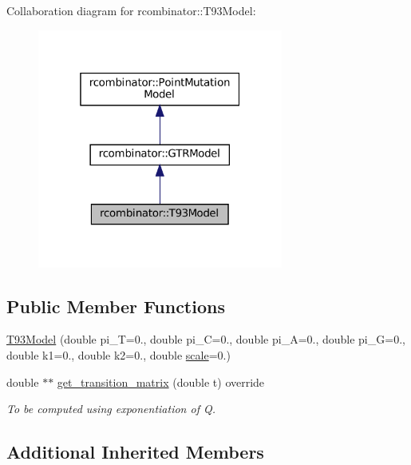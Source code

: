 Collaboration diagram for rcombinator\+:\+:T93\+Model\+:\nopagebreak
\begin{figure}[H]
\begin{center}
\leavevmode
\includegraphics[width=229pt]{classrcombinator_1_1T93Model__coll__graph}
\end{center}
\end{figure}
\subsection*{Public Member Functions}
\begin{DoxyCompactItemize}
\item 
\mbox{\hyperlink{classrcombinator_1_1T93Model_ad975a4779689bb7ea958be8d956c31ed}{T93\+Model}} (double pi\+\_\+T=0., double pi\+\_\+C=0., double pi\+\_\+A=0., double pi\+\_\+G=0., double k1=0., double k2=0., double \mbox{\hyperlink{classrcombinator_1_1PointMutationModel_a328a30a438bb1b6a625faa3f714a85c8}{scale}}=0.)
\item 
\mbox{\label{classrcombinator_1_1T93Model_ac8e280547d6af408e24df5e114d2c5c9}} 
double $\ast$$\ast$ \mbox{\hyperlink{classrcombinator_1_1T93Model_ac8e280547d6af408e24df5e114d2c5c9}{get\+\_\+transition\+\_\+matrix}} (double t) override
\begin{DoxyCompactList}\small\item\em To be computed using exponentiation of Q. \end{DoxyCompactList}\end{DoxyCompactItemize}
\subsection*{Additional Inherited Members}


